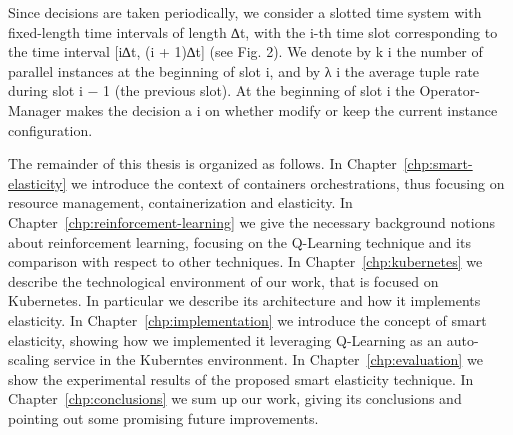Since decisions are taken periodically, we consider a slotted time system with
fixed-length time intervals of length ∆t, with the i-th time slot corresponding
to the time interval [i∆t, (i + 1)∆t] (see Fig. 2). We denote by k i the number
of parallel instances at the beginning of slot i, and by λ i the average tuple rate
during slot i − 1 (the previous slot). At the beginning of slot i the Operator-
Manager makes the decision a i on whether modify or keep the current instance
configuration.


The remainder of this thesis is organized as follows.
%
In Chapter~\ref{chp:smart-elasticity} we introduce the context of containers orchestrations, thus focusing on resource management, containerization and elasticity.
%
In Chapter~\ref{chp:reinforcement-learning} we give the necessary background notions about reinforcement learning, focusing on the Q-Learning technique and its comparison with respect to other techniques.
%
In Chapter~\ref{chp:kubernetes} we describe the technological environment of our work, that is focused on Kubernetes. In particular we describe its architecture and how it implements elasticity.
%
In Chapter~\ref{chp:implementation} we introduce the concept of smart elasticity, showing how we implemented it leveraging Q-Learning as an auto-scaling service in the Kuberntes environment.
%
In Chapter~\ref{chp:evaluation} we show the experimental results of the proposed smart elasticity technique.
%
In Chapter~\ref{chp:conclusions} we sum up our work, giving its conclusions and pointing out some promising future improvements.
